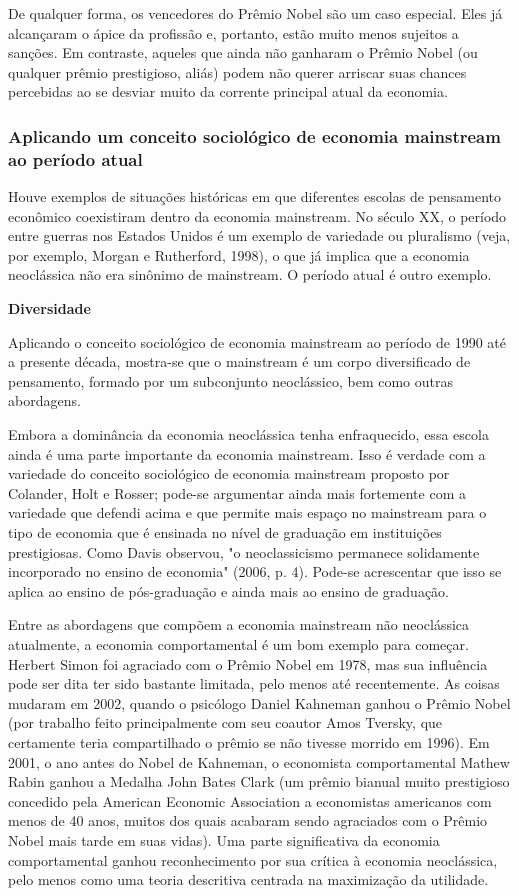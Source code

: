 \documentclass[12pt]{article}
\begin{document}
De qualquer forma, os vencedores do Prêmio Nobel são um caso especial. Eles já alcançaram o ápice da profissão e, portanto, estão muito menos sujeitos a sanções. Em contraste, aqueles que ainda não ganharam o Prêmio Nobel (ou qualquer prêmio prestigioso, aliás) podem não querer arriscar suas chances percebidas ao se desviar muito da corrente principal atual da economia.

\subsubsection{\textbf{Aplicando um conceito sociológico de economia mainstream ao período atual}}

Houve exemplos de situações históricas em que diferentes escolas de pensamento econômico coexistiram dentro da economia mainstream. No século XX, o período entre guerras nos Estados Unidos é um exemplo de variedade ou pluralismo (veja, por exemplo, Morgan e Rutherford, 1998), o que já implica que a economia neoclássica não era sinônimo de mainstream. O período atual é outro exemplo.

\textbf{Diversidade}

Aplicando o conceito sociológico de economia mainstream ao período de 1990 até a presente década, mostra-se que o mainstream é um corpo diversificado de pensamento, formado por um subconjunto neoclássico, bem como outras abordagens.

Embora a dominância da economia neoclássica tenha enfraquecido, essa escola ainda é uma parte importante da economia mainstream. Isso é verdade com a variedade do conceito sociológico de economia mainstream proposto por Colander, Holt e Rosser; pode-se argumentar ainda mais fortemente com a variedade que defendi acima e que permite mais espaço no mainstream para o tipo de economia que é ensinada no nível de graduação em instituições prestigiosas. Como Davis observou, "o neoclassicismo permanece solidamente incorporado no ensino de economia" (2006, p. 4). Pode-se acrescentar que isso se aplica ao ensino de pós-graduação e ainda mais ao ensino de graduação.

Entre as abordagens que compõem a economia mainstream não neoclássica atualmente, a economia comportamental é um bom exemplo para começar. Herbert Simon foi agraciado com o Prêmio Nobel em 1978, mas sua influência pode ser dita ter sido bastante limitada, pelo menos até recentemente. As coisas mudaram em 2002, quando o psicólogo Daniel Kahneman ganhou o Prêmio Nobel (por trabalho feito principalmente com seu coautor Amos Tversky, que certamente teria compartilhado o prêmio se não tivesse morrido em 1996). Em 2001, o ano antes do Nobel de Kahneman, o economista comportamental Mathew Rabin ganhou a Medalha John Bates Clark (um prêmio bianual muito prestigioso concedido pela American Economic Association a economistas americanos com menos de 40 anos, muitos dos quais acabaram sendo agraciados com o Prêmio Nobel mais tarde em suas vidas). Uma parte significativa da economia comportamental ganhou reconhecimento por sua crítica à economia neoclássica, pelo menos como uma teoria descritiva centrada na maximização da utilidade.
\end{document}
